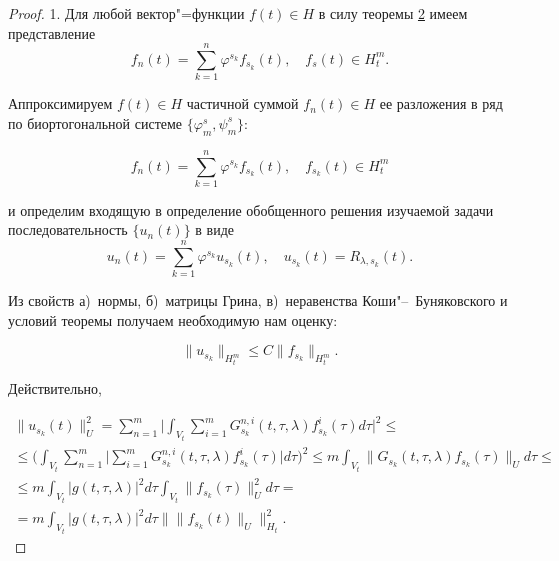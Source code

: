 \smallskip



\begin{proof} 1. Для любой вектор"=функции $f(t)\in H$ в силу теоремы \hyperlink{korn:th:2}{2} имеем представление $$f_n(t)=\sum\limits_{k=1}^n{\varphi^{s_k}f_{s_k}(t)},\quad f_s(t)\in H_t^m.$$ 

Аппроксимируем $f(t)\in H$ частичной суммой $f_n(t)\in H$ ее разложения в ряд по биортогональной системе $\{\varphi_m^s,\psi_m^s\}$:

$$

f_n(t)=\sum\limits_{k=1}^n{\varphi^{s_k}f_{s_k}(t)},\quad f_{s_k}(t)\in H_t^m

$$

и определим входящую в определение обобщенного решения изучаемой задачи последовательность $\{u_n(t)\}$ в виде $$u_n(t)=\sum\limits_{k=1}^n{\varphi^{s_k}u_{s_k}(t)},\quad  u_{s_k}(t)=R_{\lambda,s_k}(t).$$ 

Из свойств а)~нормы, б)~матрицы Грина, в)~неравенства Коши"--~Буняковского и условий теоремы получаем необходимую нам оценку: 

$$\|u_{s_k}\|_{H_t^m}\le C\|f_{s_k}\|_{H_t^m}.$$ 

Действительно,

\begin{multline*}

\|u_{s_k}(t)\|_U^2=\sum\limits_{n=1}^m 

\biggl|\int_{V_t}{\sum\limits_{i=1}^m{G_{s_k}^{n,i}(t,\tau,\lambda)f_{s_k}^i(\tau)d\tau}}\biggr|^2 

\le 

\\

\le\biggl(\int_{V_t}{\sum\limits_{n=1}^m{\biggl|\sum\limits_{i=1}^m{G_{s_k}^{n,i}(t,\tau,\lambda)f_{s_k}^i(\tau)}\biggr|d\tau}}\biggr)^2

\le 

m\int_{V_t} \|G_{s_k}(t,\tau,\lambda)f_{s_k}(\tau)\|_U d\tau\le 

\\

\le m\int_{V_t}{|g(t,\tau,\lambda)|^2d\tau}\int_{V_t} \|f_{s_k}(\tau)\|_U^2 d\tau= 

\\

=m\int_{V_t}{|g(t,\tau,\lambda)|^2d\tau}\bigl\|\|f_{s_k}(t)\|_U\bigr\|_{H_t}^2 .

\end{multline*}


\end{proof}
